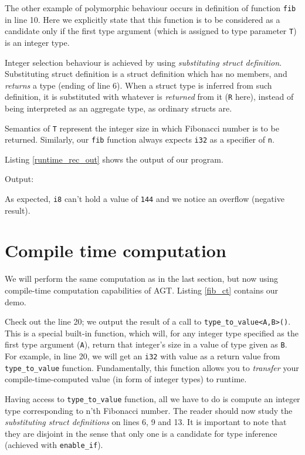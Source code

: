 \documentclass[times, utf8, diplomski]{fer}
\theoremstyle{definition}
\newcommand{\textcode}[3]{
    
}
\begin{document}
The other example of polymorphic behaviour occurs in definition of function \texttt{fib} in line 10.
Here we explicitly state that this function is to be considered as a candidate only if
the first type argument (which is assigned to type parameter \texttt{T}) is an integer type.

Integer selection behaviour is achieved by using \textit{substituting struct definition}.
Substituting struct definition is a struct definition which has no members,
and \textit{returns} a type (ending of line 6). When a struct type is inferred from such definition,
it is substituted with whatever is \textit{returned} from it (\texttt{R} here), 
instead of being interpreted as an aggregate type, as ordinary structs are.

Semantics of \texttt{T} represent the integer size in which Fibonacci number is to be returned.
Similarly, our \texttt{fib} function always expects \texttt{i32} as a specifier of \texttt{n}.

Listing \ref{runtime_rec_out} shows the output of our program.

Output:
\textcode{\resdir/programs/fib_runtime_recursion.out}{runtime_rec_out}{Fibonacci with recursion - output}

As expected, \texttt{i8} can't hold a value of \texttt{144} and we notice an overflow (negative result).


\section{Compile time computation}

We will perform the same computation as in the last section, but now using compile-time 
computation capabilities of AGT. Listing \ref{fib_ct} contains our demo.

\textcode{\resdir/programs/fib_compile_time.agt}{fib_ct}{Compile-time Fibonacci}

Check out the line 20; we output the result of a call to \texttt{type\_to\_value<A,B>()}.
This is a special built-in function, which will, for any integer type specified as the first 
type argument (\texttt{A}), return that integer's size in a value of type given as \texttt{B}.
For example, in line 20, we will get an \texttt{i32} with value  as a return value
from \texttt{type\_to\_value} function. Fundamentally, this function allows you to \textit{transfer}
your compile-time-computed value (in form of integer types) to runtime.

Having access to \texttt{type\_to\_value} function, all we have to do is compute an integer
type corresponding to n'th Fibonacci number. The reader should now study the \textit{substituting
struct definitions} on lines 6, 9 and 13. It is important to note that they are disjoint in the sense
that only one is a candidate for type inference (achieved with \texttt{enable\_if}).
\end{document}
